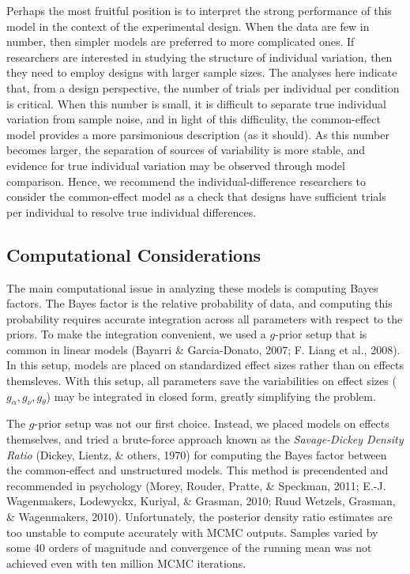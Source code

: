\documentclass[american,man]{apa6}
\begin{document}
Perhaps the most fruitful position is to interpret the strong
performance of this model in the context of the experimental design.
When the data are few in number, then simpler models are preferred to
more complicated ones. If researchers are interested in studying the
structure of individual variation, then they need to employ designs with
larger sample sizes. The analyses here indicate that, from a design
perspective, the number of trials per individual per condition is
critical. When this number is small, it is difficult to separate true
individual variation from sample noise, and in light of this
difficulity, the common-effect model provides a more parsimonious
description (as it should). As this number becomes larger, the
separation of sources of variability is more stable, and evidence for
true individual variation may be observed through model comparison.
Hence, we recommend the individual-difference researchers to consider
the common-effect model as a check that designs have sufficient trials
per individual to resolve true individual differences.

\subsection{Computational
Considerations}\label{computational-considerations}

The main computational issue in analyzing these models is computing
Bayes factors. The Bayes factor is the relative probability of data, and
computing this probability requires accurate integration across all
parameters with respect to the priors. To make the integration
convenient, we used a \(g\)-prior setup that is common in linear models
(Bayarri \& Garcia-Donato, 2007; F. Liang et al., 2008). In this setup,
models are placed on standardized effect sizes rather than on effects
themsleves. With this setup, all parameters save the variabilities on
effect sizes (\(g_\alpha, g_\nu, g_\theta\)) may be integrated in closed
form, greatly simplifying the problem.

The \(g\)-prior setup was not our first choice. Instead, we placed
models on effects themselves, and tried a brute-force approach known as
the \emph{Savage-Dickey Density Ratio} (Dickey, Lientz, \& others, 1970)
for computing the Bayes factor between the common-effect and
unstructured models. This method is precendented and recommended in
psychology (Morey, Rouder, Pratte, \& Speckman, 2011; E.-J. Wagenmakers,
Lodewyckx, Kuriyal, \& Grasman, 2010; Ruud Wetzels, Grasman, \&
Wagenmakers, 2010). Unfortunately, the posterior density ratio estimates
are too unstable to compute accurately with MCMC outputs. Samples varied
by some 40 orders of magnitude and convergence of the running mean was
not achieved even with ten million MCMC iterations.
\end{document}
